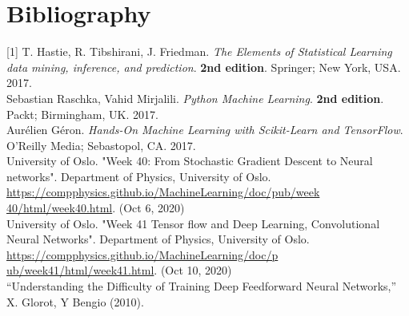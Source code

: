 \section{Bibliography}
\label{chap:Bibliography}

\label{Bib:The Elements Of Statistical Learning DataMining}[1] T. Hastie, R. Tibshirani, J. Friedman. \textit{The Elements of Statistical Learning data mining, inference, and prediction}. \textbf{2nd edition}. Springer; New York, USA. 2017.\\

\label{Bib:Python Machine Learning}\noindent [2] Sebastian Raschka, Vahid Mirjalili. \textit{Python Machine Learning}. \textbf{2nd edition}. Packt; Birmingham, UK. 2017.\\

\label{Bib:Hands-on Machine Learning}\noindent [3] Aurélien Géron. \textit{Hands-On Machine Learning with Scikit-Learn and TensorFlow}. O'Reilly Media; Sebastopol, CA. 2017.\\

\label{Bib:Week40Notes}\noindent [4] University of Oslo. "Week 40: From Stochastic Gradient Descent to Neural networks". Department of Physics, University of Oslo. \href{https://compphysics.github.io/MachineLearning/doc/pub/week40/html/week40.html}{https://compphysics.github.io/MachineLearning/doc/pub/week}
\href{https://compphysics.github.io/MachineLearning/doc/pub/week40/html/week40.html}{40/html/week40.html}. (Oct 6, 2020)\\

\label{Bib:Week41Notes}\noindent [5] University of Oslo. "Week 41 Tensor flow and Deep Learning, Convolutional Neural Networks". Department of Physics, University of Oslo. \href{https://compphysics.github.io/MachineLearning/doc/pub/week41/html/week41.html}{https://compphysics.github.io/MachineLearning/doc/p}
\href{https://compphysics.github.io/MachineLearning/doc/pub/week41/html/week41.html}{ub/week41/html/week41.html}. (Oct 10, 2020)\\

\label{Bib:XavierHe}\noindent [6] “Understanding the Difficulty of Training Deep Feedforward Neural Networks,” X. Glorot, Y Bengio (2010).
